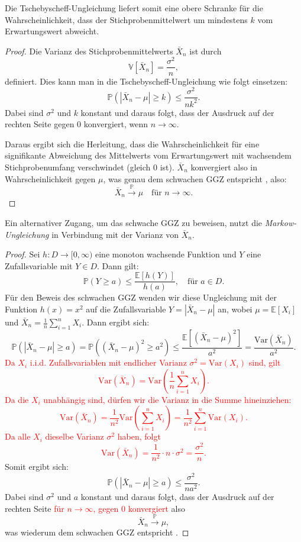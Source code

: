 \documentclass[aodsor,preprint]{imsart}
\numberwithin{equation}{section}
\theoremstyle{plain}
\begin{document}
Die Tschebyscheff-Ungleichung liefert somit eine obere Schranke für die Wahrscheinlichkeit, dass der Stichprobenmittelwert um mindestens \(k\) vom Erwartungswert abweicht.

\begin{proof}
Die Varianz des Stichprobenmittelwerts \( \bar{X}_n \) ist durch
\[
\mathbb{V}[\bar{X}_n] = \frac{\sigma^2}{n},
\]
definiert. Dies kann man in die Tschebyscheff-Ungleichung wie folgt einsetzen:
\[
\mathbb{P} \left( \left| \bar{X}_n - \mu \right| \geq k \right) \leq \frac{\sigma^2}{n k^2}.
\]
Dabei sind \(\sigma^2\) und \(k\) konstant und daraus folgt, dass der Ausdruck auf der rechten Seite gegen 0 konvergiert, wenn \(n \to \infty\). 

Daraus ergibt sich die Herleitung, dass die Wahrscheinlichkeit für eine signifikante Abweichung des Mittelwerts vom Erwartungswert mit wachsendem Stichprobenumfang verschwindet (gleich 0 ist). \(\bar{X}_n\) konvergiert also in Wahrscheinlichkeit gegen \(\mu\), was genau dem schwachen GGZ entspricht \citep{degroot2021}, also:
\[
\bar{X}_n \xrightarrow{\mathbb{P}} \mu \quad \text{für } n \to \infty.
\]
\end{proof}


Ein alternativer Zugang, um das schwache GGZ zu beweisen, nutzt die \textit{Markow-Ungleichung} \citep{georgii2009} in Verbindung mit der Varianz von \( \bar{X}_n \).

\begin{proof}
Sei \( h \colon D \to [0,\infty) \) eine monoton wachsende Funktion und \( Y \) eine Zufallsvariable mit \( Y \in D \). Dann gilt:
\[
\mathbb{P}(Y \geq a) \leq \frac{\mathbb{E}[h(Y)]}{h(a)}, \quad \text{für } a \in D.
\]
Für den Beweis des schwachen GGZ wenden wir diese Ungleichung mit der Funktion \( h(x) = x^2 \) auf die Zufallsvariable \( Y = |\bar{X}_n - \mu| \) an, wobei \( \mu = \mathbb{E}[X_i] \) und \( \bar{X}_n = \frac{1}{n} \sum_{i=1}^n X_i \). Dann ergibt sich:
\[
\mathbb{P}\left( |\bar{X}_n - \mu| \geq a \right)
= \mathbb{P}\left( (\bar{X}_n - \mu)^2 \geq a^2 \right)
\leq \frac{\mathbb{E}[(\bar{X}_n - \mu)^2]}{a^2}
= \frac{\text{Var}(\bar{X}_n)}{a^2}.
\]
\textcolor{red}{
Da \( X_i \) i.i.d. Zufallsvariablen mit endlicher Varianz \( \sigma^2 = \text{Var}(X_i) \) sind, gilt
\[
\text{Var}(\bar{X}_n) = \text{Var}\left( \frac{1}{n} \sum_{i=1}^n X_i \right).
\]
Da die \( X_i \) unabhängig sind, dürfen wir die Varianz in die Summe hineinziehen:
\[
\text{Var}(\bar{X}_n) = \frac{1}{n^2} \text{Var}\left( \sum_{i=1}^n X_i \right)
= \frac{1}{n^2} \sum_{i=1}^n \text{Var}(X_i).
\]
Da alle \( X_i \) dieselbe Varianz \( \sigma^2 \) haben, folgt
\[
\text{Var}(\bar{X}_n) = \frac{1}{n^2} \cdot n \cdot \sigma^2 = \frac{\sigma^2}{n}.
\]
}
Somit ergibt sich:
\[
\mathbb{P}\left( |\bar{X}_n - \mu| \geq a \right) \leq \frac{\sigma^2}{n a^2}.
\]
Dabei sind \(\sigma^2\) und \(a\) konstant und daraus folgt, dass der Ausdruck auf der rechten Seite \textcolor{red}{für \( n \to \infty \), gegen 0 konvergiert} also
\[
\bar{X}_n \xrightarrow{\mathbb{P}} \mu,
\]
was wiederum dem schwachen GGZ entspricht \citep{degroot2021}.
\end{proof}
\end{document}
